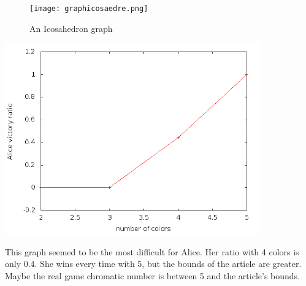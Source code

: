 \begin{figure}[h]
\begin{center}  
	\texttt{[image: graphicosaedre.png]}
\end{center}
    \caption{An Icosahedron graph}
    \label{icograph}
\end{figure}

\includegraphics[width=11cm]{resultats/icosaedre.png}

This graph seemed to be the most difficult for Alice. Her ratio with 4 colors is only 0.4. She wins every time with 5, but the bounds of the article are greater. Maybe the real game chromatic number is between 5 and the article's bounds.